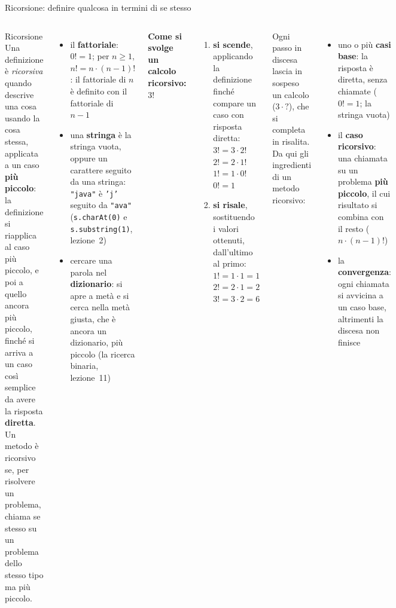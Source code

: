 \documentclass[10pt,aspectratio=169]{beamer}
\begin{document}
\begin{frame}[fragile]{Ricorsione: definire qualcosa in termini di se stesso}
\begin{columns}[T]
\begin{block}{Ricorsione}
\small Una definizione è \emph{ricorsiva} quando descrive una cosa usando la cosa stessa, applicata a un caso \textbf{più piccolo}: la definizione si riapplica al caso più piccolo, e poi a quello ancora più piccolo, finché si arriva a un caso così semplice da avere la risposta \textbf{diretta}. Un metodo è ricorsivo se, per risolvere un problema, chiama se stesso su un problema dello stesso tipo ma più piccolo.
\end{block}
\footnotesize
\begin{itemize}\itemsep=3pt
    \item il \textbf{fattoriale}: $0! = 1$; per $n \geq 1$, $n! = n \cdot (n-1)!$: il fattoriale di $n$ è definito con il fattoriale di $n-1$
    \item una \textbf{stringa} è la stringa vuota, oppure un carattere seguito da una stringa: \texttt{"java"} è \texttt{'j'} seguito da \texttt{"ava"} (\texttt{s.charAt(0)} e \texttt{s.substring(1)}, lezione~2)
    \item cercare una parola nel \textbf{dizionario}: si apre a metà e si cerca nella metà giusta, che è ancora un dizionario, più piccolo (la ricerca binaria, lezione~11)
\end{itemize}

\footnotesize
\textbf{Come si svolge un calcolo ricorsivo: $3!$}
\begin{enumerate}\itemsep=2pt
    \item \textbf{si scende}, applicando la definizione finché compare un caso con risposta diretta:\\
    $3! = 3 \cdot 2!$ \quad $2! = 2 \cdot 1!$ \quad $1! = 1 \cdot 0!$ \quad $0! = 1$
    \item \textbf{si risale}, sostituendo i valori ottenuti, dall'ultimo al primo:\\
    $1! = 1 \cdot 1 = 1$ \quad $2! = 2 \cdot 1 = 2$ \quad $3! = 3 \cdot 2 = 6$
\end{enumerate}
Ogni passo in discesa lascia in sospeso un calcolo ($3 \cdot {?}$), che si completa in risalita. Da qui gli ingredienti di un metodo ricorsivo:
\begin{itemize}\itemsep=2pt
    \item uno o più \textbf{casi base}: la risposta è diretta, senza chiamate ($0! = 1$; la stringa vuota)
    \item il \textbf{caso ricorsivo}: una chiamata su un problema \textbf{più piccolo}, il cui risultato si combina con il resto ($n \cdot (n-1)!$)
    \item la \textbf{convergenza}: ogni chiamata si avvicina a un caso base, altrimenti la discesa non finisce
\end{itemize}
\end{columns}
\end{frame}
\end{document}
